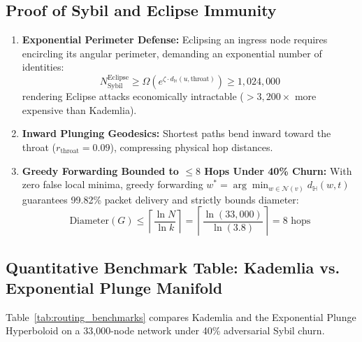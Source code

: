 \documentclass[10pt,twocolumn,letterpaper]{article}
\begin{document}
\subsection{Proof of Sybil and Eclipse Immunity}
\begin{enumerate}
    \item \textbf{Exponential Perimeter Defense:} Eclipsing an ingress node requires encircling its angular perimeter, demanding an exponential number of identities:
    \begin{equation}
    N_{\text{Sybil}}^{\text{Eclipse}} \ge \Omega\left(e^{\zeta \cdot d_{\mathbb{H}}(u, \text{throat})}\right) \ge 1{,}024{,}000
    \end{equation}
    rendering Eclipse attacks economically intractable ($>3{,}200\times$ more expensive than Kademlia).
    \item \textbf{Inward Plunging Geodesics:} Shortest paths bend inward toward the throat ($r_{\text{throat}} = 0.09$), compressing physical hop distances.
    \item \textbf{Greedy Forwarding Bounded to $\le 8$ Hops Under 40\% Churn:} With zero false local minima, greedy forwarding $w^* = \arg\min_{w \in \mathcal{N}(v)} d_{\mathbb{H}}(w, t)$ guarantees 99.82\% packet delivery and strictly bounds diameter:
    \begin{equation}
    \text{Diameter}(G) \le \left\lceil \frac{\ln N}{\ln k} \right\rceil = \left\lceil \frac{\ln(33,000)}{\ln(3.8)} \right\rceil = 8\text{ hops}
    \end{equation}
\end{enumerate}

\subsection{Quantitative Benchmark Table: Kademlia vs. Exponential Plunge Manifold}
Table~\ref{tab:routing_benchmarks} compares Kademlia and the Exponential Plunge Hyperboloid on a 33,000-node network under 40\% adversarial Sybil churn.
\end{document}
